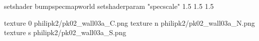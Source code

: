 setshader bumpspecmapworld
setshaderparam "specscale" 1.5 1.5 1.5

texture 0 philipk2/pk02_wall03a_C.png
texture n philipk2/pk02_wall03a_N.png
texture s philipk2/pk02_wall03a_S.png

